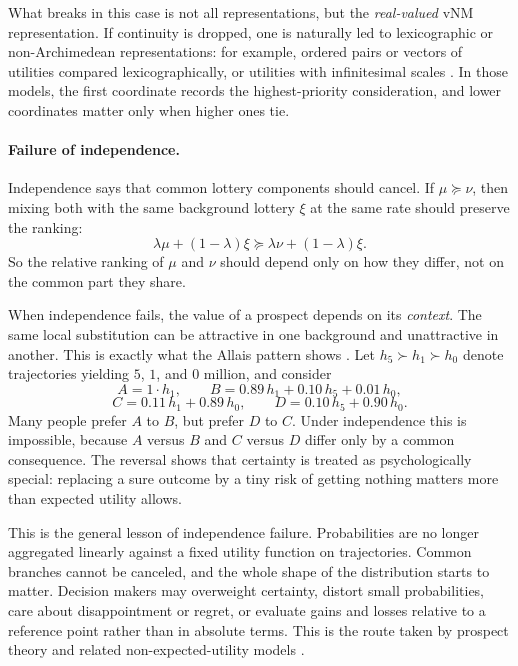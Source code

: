 \documentclass[11pt]{article}
\newcommand{\pref}{\succcurlyeq}
\begin{document}
What breaks in this case is not all representations, but the \emph{real-valued}
vNM representation. If continuity is dropped, one is naturally led to
lexicographic or non-Archimedean representations: for example, ordered pairs or
vectors of utilities compared lexicographically, or utilities with infinitesimal
scales \citep{fishburn1971lexicographic}. In those models, the first coordinate
records the highest-priority consideration, and lower coordinates matter only
when higher ones tie. 


\paragraph{Failure of independence.}

Independence says that common lottery components should cancel. If $\mu\pref\nu$, then mixing both with the same background lottery $\xi$ at the same rate should preserve the ranking:
\[
\lambda \mu +(1-\lambda)\xi \pref \lambda \nu +(1-\lambda)\xi.
\]
So the relative ranking of $\mu$ and $\nu$ should depend only on how they differ, not on the common part they share.

When independence fails, the value of a prospect depends on its \emph{context}. The same local substitution can be attractive in one background and unattractive in another. This is exactly what the Allais pattern shows \citep{allais1953comportement}. Let $h_5\succ h_1\succ h_0$ denote trajectories yielding $5$, $1$, and $0$ million, and consider
\[
A = 1\cdot h_1,
\qquad
B = 0.89\, h_1 + 0.10\, h_5 + 0.01\, h_0,
\]
\[
C = 0.11\, h_1 + 0.89\, h_0,
\qquad
D = 0.10\, h_5 + 0.90\, h_0.
\]
Many people prefer $A$ to $B$, but prefer $D$ to $C$. Under independence this is impossible, because $A$ versus $B$ and $C$ versus $D$ differ only by a common consequence. The reversal shows that certainty is treated as psychologically special: replacing a sure outcome by a tiny risk of getting nothing matters more than expected utility allows.

This is the general lesson of independence failure. Probabilities are no longer aggregated linearly against a fixed utility function on trajectories. Common branches cannot be canceled, and the whole shape of the distribution starts to matter. Decision makers may overweight certainty, distort small probabilities, care about disappointment or regret, or evaluate gains and losses relative to a reference point rather than in absolute terms. This is the route taken by prospect theory and related non-expected-utility models \citep{kahneman1979prospect,machina1982expected}.
\end{document}
